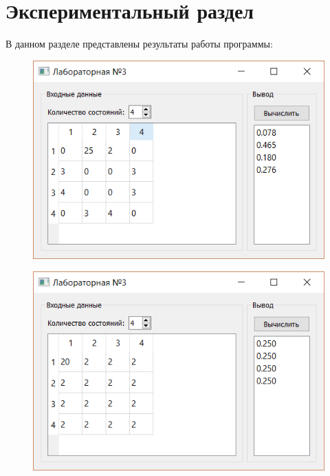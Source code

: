\newpage
\section{Экспериментальный раздел}
В данном разделе представлены результаты работы программы:

\begin{figure}[!h]
	\centering
	\includegraphics[width=0.7\linewidth]{src/result1}
	\caption{}
	\label{fig:result1}
\end{figure}

\begin{figure}[!h]
	\centering
	\includegraphics[width=0.7\linewidth]{src/result2}
	\caption{}
	\label{fig:result2}
\end{figure}

